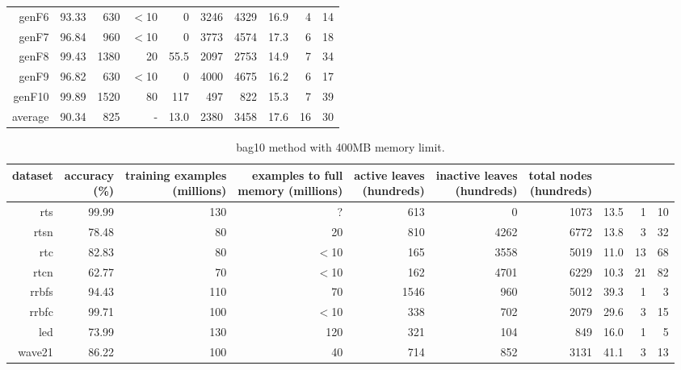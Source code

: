 \begin{table}
\begin{tabular}{|r|r|r|r|r|r|r|r|r|r|}
{\sc genF6} & 93.33 & 630 & $<$10 & 0 & 3246 & 4329 & 16.9 & 4 & 14 \\
{\sc genF7} & 96.84 & 960 & $<$10 & 0 & 3773 & 4574 & 17.3 & 6 & 18 \\
{\sc genF8} & 99.43 & 1380 & 20 & 55.5 & 2097 & 2753 & 14.9 & 7 & 34 \\
{\sc genF9} & 96.82 & 630 & $<$10 & 0 & 4000 & 4675 & 16.2 & 6 & 17 \\
{\sc genF10} & 99.89 & 1520 & 80 & 117 & 497 & 822 & 15.3 & 7 & 39 \\
\hline
average & 90.34 & 825 &  -  & 13.0 & 2380 & 3458 & 17.6 & 16 & 30 \\
\hline
\end{tabular}
\end{table}
\clearpage
\begin{table}
\caption{{\sc bag10} method with 400MB memory limit.}
\label{tab:bag10-400MB}
\centering
\begin{tabular}{|r|r|r|r|r|r|r|r|r|r|}
\hline
dataset	&
\rotatebox{90}{\parbox{9em}{accuracy\\(\%)}} &
\rotatebox{90}{\parbox{9em}{training examples\\(millions)}} &
\rotatebox{90}{\parbox{9em}{examples to full\\memory (millions)}} &
\rotatebox{90}{\parbox{9em}{active leaves\\(hundreds)}} &
\rotatebox{90}{\parbox{9em}{inactive leaves\\(hundreds)}} &
\rotatebox{90}{\parbox{9em}{total nodes\\(hundreds)}} &
\rotatebox{90}{\parbox{9em}{average tree depth}}	&
\rotatebox{90}{\parbox{9em}{training speed (\%)}} &
\rotatebox{90}{\parbox{9em}{prediction speed (\%)}} \\
\hline
{\sc rts} & 99.99 & 130 & ? & 613 & 0 & 1073 & 13.5 & 1 & 10 \\
{\sc rtsn} & 78.48 & 80 & 20 & 810 & 4262 & 6772 & 13.8 & 3 & 32 \\
{\sc rtc} & 82.83 & 80 & $<$10 & 165 & 3558 & 5019 & 11.0 & 13 & 68 \\
{\sc rtcn} & 62.77 & 70 & $<$10 & 162 & 4701 & 6229 & 10.3 & 21 & 82 \\
{\sc rrbfs} & 94.43 & 110 & 70 & 1546 & 960 & 5012 & 39.3 & 1 & 3 \\
{\sc rrbfc} & 99.71 & 100 & $<$10 & 338 & 702 & 2079 & 29.6 & 3 & 15 \\
{\sc led} & 73.99 & 130 & 120 & 321 & 104 & 849 & 16.0 & 1 & 5 \\
{\sc wave21} & 86.22 & 100 & 40 & 714 & 852 & 3131 & 41.1 & 3 & 13 \\

\end{tabular}
\end{table}
